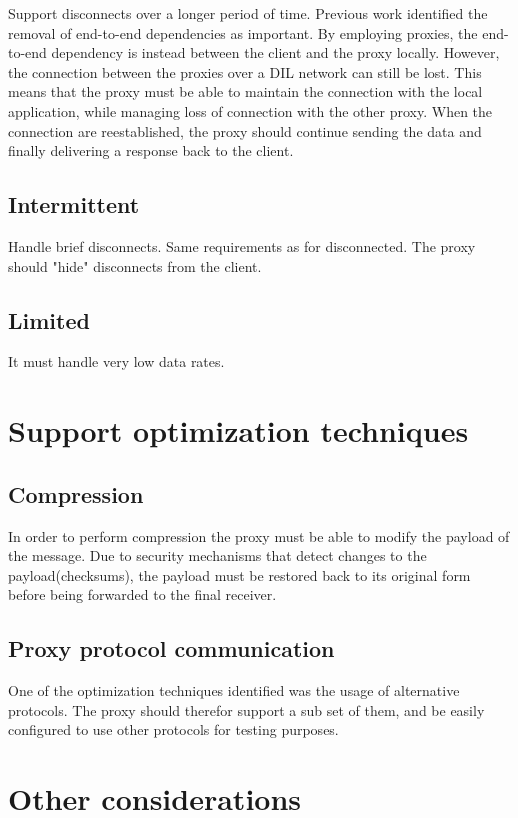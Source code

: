 Support disconnects over a longer period of time. Previous work identified the
removal of end-to-end dependencies as important. By employing proxies, the
end-to-end dependency is instead between the client and the proxy locally.
However, the connection between the proxies over a DIL network can still be
lost. This means that the proxy must be able to maintain the connection with the
local application, while managing loss of connection with the other proxy. When
the connection are reestablished, the proxy should continue sending the data and
finally delivering a response back to the client.

\subsection{Intermittent}

Handle brief disconnects. Same requirements as for disconnected. The proxy should "hide" disconnects from the client.

\subsection{Limited}

It must handle very low data rates.

\section{Support optimization techniques}

\subsection{Compression}

In order to perform compression the proxy must be able to modify the payload of
the message. Due to security mechanisms that detect changes to the
payload(checksums), the payload must be restored back to its original form
before being forwarded to the final receiver.

\subsection{Proxy protocol communication}

One of the optimization techniques identified was the usage of alternative
protocols. The proxy should therefor support a sub set of them, and be easily
configured to use other protocols for testing purposes.

\section{Other considerations}

